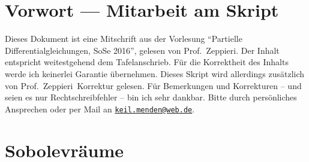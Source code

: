 \newcommand{\Semester}{SoSe 2016}
\newcommand{\fach}{Partielle Differentialgleichungen}
\newcommand{\prof}{Prof.\ Zeppieri}






\maketitle
\cleardoubleoddemptypage

\section*{Vorwort --- Mitarbeit am Skript}
Dieses Dokument ist eine Mitschrift aus der Vorlesung \enquote{\fach, \Semester}, gelesen von \prof. 
Der Inhalt entspricht weitestgehend dem Tafelanschrieb. 
Für die Korrektheit des Inhalts werde ich keinerlei Garantie übernehmen. Dieses Skript wird allerdings zusätzlich von \prof \, Korrektur gelesen. 
Für Bemerkungen und Korrekturen -- und seien es nur Rechtschreibfehler -- bin ich sehr dankbar. 
Bitte durch persönliches Ansprechen oder per Mail an \href{mailto:keil.menden@web.de}{\nolinkurl{keil.menden@web.de}}.  

\newpage

\tableofcontents
\cleardoubleoddemptypage
{}
\setcounter{page}{1}





















\newpage
\section{Sobolevräume} 
\label{sec:sobolevraume}

